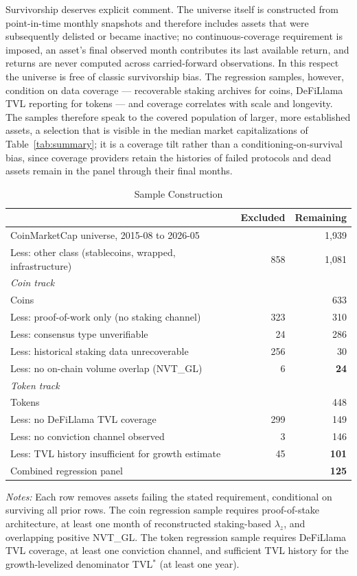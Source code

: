 \documentclass[12pt]{article}
\begin{document}
Survivorship deserves explicit comment. The universe itself is constructed from
point-in-time monthly snapshots and therefore includes assets that were subsequently
delisted or became inactive; no continuous-coverage requirement is imposed, an asset's
final observed month contributes its last available return, and returns are never
computed across carried-forward observations. In this respect the universe is free of
classic survivorship bias. The regression samples, however, condition on data
coverage --- recoverable staking archives for coins, DeFiLlama TVL reporting for
tokens --- and coverage correlates with scale and longevity. The samples therefore
speak to the covered population of larger, more established assets, a selection that is
visible in the median market capitalizations of Table~\ref{tab:summary}; it is a
coverage tilt rather than a conditioning-on-survival bias, since coverage providers
retain the histories of failed protocols and dead assets remain in the panel through
their final months.

\begin{table}[ht]
\centering
\caption{Sample Construction}
\label{tab:funnel}
\small
\begin{tabular}{lrr}
\toprule
 & Excluded & Remaining \\
\midrule
CoinMarketCap universe, 2015-08 to 2026-05 & & 1,939 \\
Less: other class (stablecoins, wrapped, infrastructure) & 858 & 1,081 \\
\midrule
\multicolumn{3}{l}{\textit{Coin track}} \\
Coins & & 633 \\
Less: proof-of-work only (no staking channel) & 323 & 310 \\
Less: consensus type unverifiable & 24 & 286 \\
Less: historical staking data unrecoverable & 256 & 30 \\
Less: no on-chain volume overlap (NVT\_GL) & 6 & \textbf{24} \\
\midrule
\multicolumn{3}{l}{\textit{Token track}} \\
Tokens & & 448 \\
Less: no DeFiLlama TVL coverage & 299 & 149 \\
Less: no conviction channel observed & 3 & 146 \\
Less: TVL history insufficient for growth estimate & 45 & \textbf{101} \\
\midrule
Combined regression panel & & \textbf{125} \\
\bottomrule
\end{tabular}
\smallskip

\parbox{0.85\linewidth}{\footnotesize
\textit{Notes:} Each row removes assets failing the stated requirement, conditional on
surviving all prior rows. The coin regression sample requires proof-of-stake
architecture, at least one month of reconstructed staking-based $\lambda_z$, and
overlapping positive NVT\_GL. The token regression sample requires DeFiLlama TVL
coverage, at least one conviction channel, and sufficient TVL history for the
growth-levelized denominator TVL$^*$ (at least one year).
}
\end{table}
\end{document}
